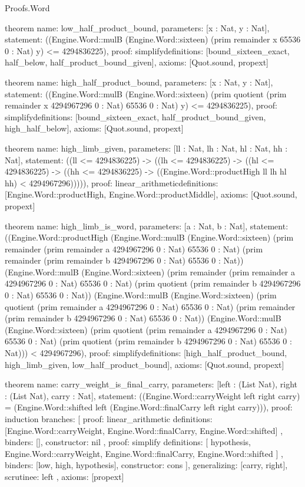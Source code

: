 \begin{lexlean}{Proofs.Word}
\begin{semanticmodule}
theorem{
  name: low_half_product_bound,
  parameters: [x : Nat, y : Nat],
  statement: ((Engine.Word::mulB (Engine.Word::sixteen) (prim remainder x 65536 0 : Nat) y) <= 4294836225),
  proof: simplify{definitions: [bound_sixteen_exact, half_below, half_product_bound_given]},
  axioms: [Quot.sound, propext]
}

theorem{
  name: high_half_product_bound,
  parameters: [x : Nat, y : Nat],
  statement: ((Engine.Word::mulB (Engine.Word::sixteen) (prim quotient (prim remainder x 4294967296 0 : Nat) 65536 0 : Nat) y) <= 4294836225),
  proof: simplify{definitions: [bound_sixteen_exact, half_product_bound_given, high_half_below]},
  axioms: [Quot.sound, propext]
}

theorem{
  name: high_limb_given,
  parameters: [ll : Nat, lh : Nat, hl : Nat, hh : Nat],
  statement: ((ll <= 4294836225) -> ((lh <= 4294836225) -> ((hl <= 4294836225) -> ((hh <= 4294836225) -> ((Engine.Word::productHigh ll lh hl hh) < 4294967296))))),
  proof: linear_arithmetic{definitions: [Engine.Word::productHigh, Engine.Word::productMiddle]},
  axioms: [Quot.sound, propext]
}

theorem{
  name: high_limb_is_word,
  parameters: [a : Nat, b : Nat],
  statement: ((Engine.Word::productHigh (Engine.Word::mulB (Engine.Word::sixteen) (prim remainder (prim remainder a 4294967296 0 : Nat) 65536 0 : Nat) (prim remainder (prim remainder b 4294967296 0 : Nat) 65536 0 : Nat)) (Engine.Word::mulB (Engine.Word::sixteen) (prim remainder (prim remainder a 4294967296 0 : Nat) 65536 0 : Nat) (prim quotient (prim remainder b 4294967296 0 : Nat) 65536 0 : Nat)) (Engine.Word::mulB (Engine.Word::sixteen) (prim quotient (prim remainder a 4294967296 0 : Nat) 65536 0 : Nat) (prim remainder (prim remainder b 4294967296 0 : Nat) 65536 0 : Nat)) (Engine.Word::mulB (Engine.Word::sixteen) (prim quotient (prim remainder a 4294967296 0 : Nat) 65536 0 : Nat) (prim quotient (prim remainder b 4294967296 0 : Nat) 65536 0 : Nat))) < 4294967296),
  proof: simplify{definitions: [high_half_product_bound, high_limb_given, low_half_product_bound]},
  axioms: [Quot.sound, propext]
}

theorem{
  name: carry_weight_is_final_carry,
  parameters: [left : (List Nat), right : (List Nat), carry : Nat],
  statement: ((Engine.Word::carryWeight left right carry) = (Engine.Word::shifted left (Engine.Word::finalCarry left right carry))),
  proof: induction{
    branches: [
      {
        proof: linear_arithmetic{
          definitions: [Engine.Word::carryWeight, Engine.Word::finalCarry, Engine.Word::shifted]
        },
        binders: [],
        constructor: nil
      },
      {
        proof: simplify{
          definitions: [
            hypothesis,
            Engine.Word::carryWeight,
            Engine.Word::finalCarry,
            Engine.Word::shifted
          ]
        },
        binders: [low, high, hypothesis],
        constructor: cons
      }
    ],
    generalizing: [carry, right],
    scrutinee: left
  },
  axioms: [propext]
}


\end{semanticmodule}
\end{lexlean}
